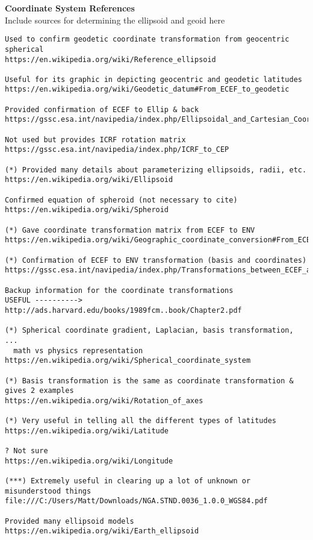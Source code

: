 \documentclass[11pt,dvipsnames]{thesis}
\begin{document}
{\centering\textbf{\Large Coordinate System References}}\\
Include sources for determining the ellipsoid and geoid here
\begin{verbatim}
Used to confirm geodetic coordinate transformation from geocentric spherical
https://en.wikipedia.org/wiki/Reference_ellipsoid

Useful for its graphic in depicting geocentric and geodetic latitudes
https://en.wikipedia.org/wiki/Geodetic_datum#From_ECEF_to_geodetic

Provided confirmation of ECEF to Ellip & back
https://gssc.esa.int/navipedia/index.php/Ellipsoidal_and_Cartesian_Coordinates_Conversion

Not used but provides ICRF rotation matrix
https://gssc.esa.int/navipedia/index.php/ICRF_to_CEP

(*) Provided many details about parameterizing ellipsoids, radii, etc.
https://en.wikipedia.org/wiki/Ellipsoid

Confirmed equation of spheroid (not necessary to cite)
https://en.wikipedia.org/wiki/Spheroid

(*) Gave coordinate transformation matrix from ECEF to ENV
https://en.wikipedia.org/wiki/Geographic_coordinate_conversion#From_ECEF_to_ENU

(*) Confirmation of ECEF to ENV transformation (basis and coordinates)
https://gssc.esa.int/navipedia/index.php/Transformations_between_ECEF_and_ENU_coordinates

Backup information for the coordinate transformations
USEFUL ----------> http://ads.harvard.edu/books/1989fcm..book/Chapter2.pdf

(*) Spherical coordinate gradient, Laplacian, basis transformation, ...
  math vs physics representation
https://en.wikipedia.org/wiki/Spherical_coordinate_system

(*) Basis transformation is the same as coordinate transformation & gives 2 examples
https://en.wikipedia.org/wiki/Rotation_of_axes

(*) Very useful in telling all the different types of latitudes
https://en.wikipedia.org/wiki/Latitude

? Not sure
https://en.wikipedia.org/wiki/Longitude

(***) Extremely useful in clearing up a lot of unknown or misunderstood things
file:///C:/Users/Matt/Downloads/NGA.STND.0036_1.0.0_WGS84.pdf

Provided many ellipsoid models
https://en.wikipedia.org/wiki/Earth_ellipsoid


\end{verbatim}
\end{document}
